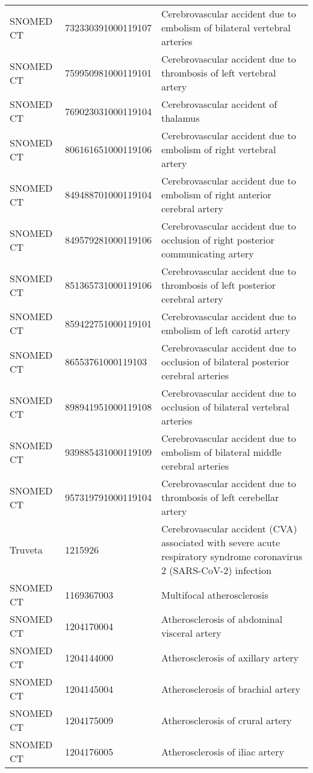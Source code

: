 \begin{longtable}{p{}p{}p{}}
  SNOMED CT & 732330391000119107 & Cerebrovascular accident due to embolism of bilateral vertebral arteries \\ 
  SNOMED CT & 759950981000119101 & Cerebrovascular accident due to thrombosis of left vertebral artery \\ 
  SNOMED CT & 769023031000119104 & Cerebrovascular accident of thalamus \\ 
  SNOMED CT & 806161651000119106 & Cerebrovascular accident due to embolism of right vertebral artery \\ 
  SNOMED CT & 849488701000119104 & Cerebrovascular accident due to embolism of right anterior cerebral artery \\ 
  SNOMED CT & 849579281000119106 & Cerebrovascular accident due to occlusion of right posterior communicating artery \\ 
  SNOMED CT & 851365731000119106 & Cerebrovascular accident due to thrombosis of left posterior cerebral artery \\ 
  SNOMED CT & 859422751000119101 & Cerebrovascular accident due to embolism of left carotid artery \\ 
  SNOMED CT & 86553761000119103 & Cerebrovascular accident due to occlusion of bilateral posterior cerebral arteries \\ 
  SNOMED CT & 898941951000119108 & Cerebrovascular accident due to occlusion of bilateral vertebral arteries \\ 
  SNOMED CT & 939885431000119109 & Cerebrovascular accident due to embolism of bilateral middle cerebral arteries \\ 
  SNOMED CT & 957319791000119104 & Cerebrovascular accident due to thrombosis of left cerebellar artery \\ 
  Truveta & 1215926 & Cerebrovascular accident (CVA) associated with severe acute respiratory syndrome coronavirus 2 (SARS-CoV-2) infection \\ 
  SNOMED CT & 1169367003 & Multifocal atherosclerosis \\ 
  SNOMED CT & 1204170004 & Atherosclerosis of abdominal visceral artery \\ 
  SNOMED CT & 1204144000 & Atherosclerosis of axillary artery \\ 
  SNOMED CT & 1204145004 & Atherosclerosis of brachial artery \\ 
  SNOMED CT & 1204175009 & Atherosclerosis of crural artery \\ 
  SNOMED CT & 1204176005 & Atherosclerosis of iliac artery \\ 

\end{longtable}
